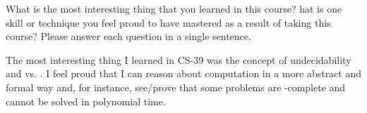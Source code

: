 \begin{problem}
  What is the most interesting thing that you learned in this course?
  hat is one skill or technique you feel proud to have mastered as a
  result of taking this course? Please answer each question in a single
  sentence.
\end{problem}
\begin{Answer}
  The most interesting thing I learned in CS-39 was the concept of undecidability
  and \sfP vs. \sfNP. I feel proud that I can reason about computation
  in a more abstract and formal way and, for instance, see/prove
  that some problems are \sfNP-complete and cannot be solved in polynomial time.
\end{Answer}
